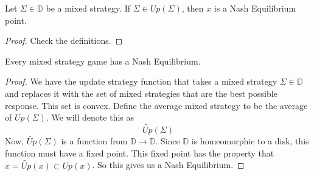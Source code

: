 \begin{claim}
	Let $\Sigma \in \mathbb D$ be a mixed strategy. If $\Sigma\in Up(\Sigma)$,  then $x$ is a Nash Equilibrium point. 
\end{claim}
\begin{proof}
	Check the definitions. 
\end{proof}
\begin{theorem}
	Every mixed strategy game has a Nash Equilibrium. 
\end{theorem}
\begin{proof}
	We have the update strategy function that takes a mixed strategy $\Sigma\in \mathbb D$ and replaces it with the set of mixed strategies that are the best possible response. This set is convex. Define the average mixed strategy to be the average of $Up(\Sigma)$. We will denote this as 
	\[\widetilde{Up}(\Sigma)\]
	Now,  $\widetilde{Up}(\Sigma)$ is a function from $\mathbb D\to \mathbb D$. Since $\mathbb D$ is homeomorphic to a disk,  this function must have a fixed point. This fixed point has the property that $x=\widetilde{Up}(x)\subset Up(x)$. So this gives us a Nash Equilibrium.
\end{proof}